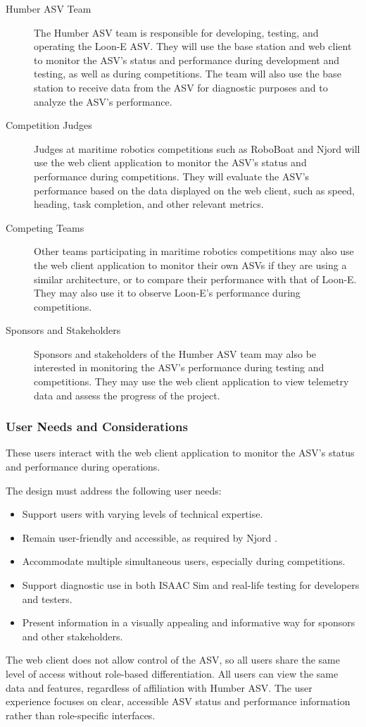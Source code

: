 \begin{description}
    \item[Humber ASV Team] The Humber ASV team is responsible for developing, testing, and operating the Loon-E ASV. They will use the base station and web client to monitor the ASV's status and performance during development and testing, as well as during competitions. The team will also use the base station to receive data from the ASV for diagnostic purposes and to analyze the ASV's performance.
    \item[Competition Judges] Judges at maritime robotics competitions such as RoboBoat and Njord will use the web client application to monitor the ASV's status and performance during competitions. They will evaluate the ASV's performance based on the data displayed on the web client, such as speed, heading, task completion, and other relevant metrics.
    \item[Competing Teams] Other teams participating in maritime robotics competitions may also use the web client application to monitor their own ASVs if they are using a similar architecture, or to compare their performance with that of Loon-E. They may also use it to observe Loon-E's performance during competitions.
    \item[Sponsors and Stakeholders] Sponsors and stakeholders of the Humber ASV team may also be interested in monitoring the ASV's performance during testing and competitions. They may use the web client application to view telemetry data and assess the progress of the project.
\end{description}

\subsubsection{User Needs and Considerations}
\label{sec:basestation-user-needs}

These users interact with the web client application to monitor the ASV's status and performance during operations.

The design must address the following user needs:
\begin{itemize}
    \item Support users with varying levels of technical expertise.
    \item Remain user-friendly and accessible, as required by Njord \autocite{NJORDGUI}.
    \item Accommodate multiple simultaneous users, especially during competitions.
    \item Support diagnostic use in both ISAAC Sim and real-life testing for developers and testers.
    \item Present information in a visually appealing and informative way for sponsors and other stakeholders.
\end{itemize}

The web client does not allow control of the ASV, so all users share the same level of access without role-based differentiation.
All users can view the same data and features, regardless of affiliation with Humber ASV.
The user experience focuses on clear, accessible ASV status and performance information rather than role-specific interfaces.